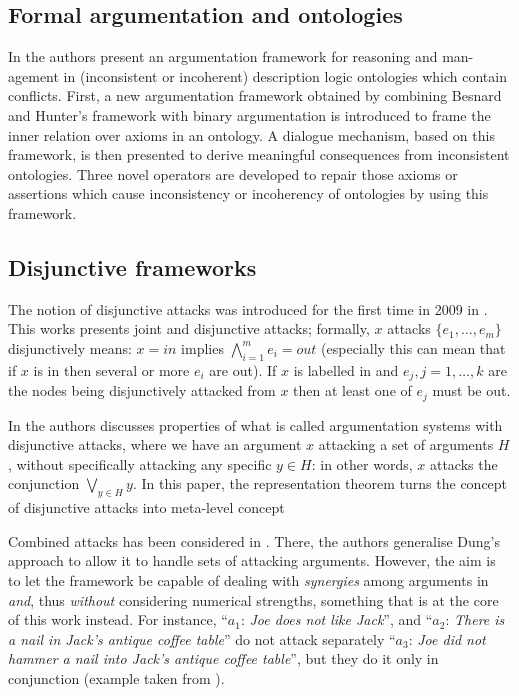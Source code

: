 \documentclass{llncs}%
\begin{document}
    
\subsection{Formal argumentation and ontologies}
In \cite{ontology} the authors present an argumentation framework for reasoning and man- agement in (inconsistent or incoherent) description logic ontologies which contain conflicts. First, a new argumentation framework obtained by combining Besnard and Hunter’s framework with binary argumentation is introduced to frame the inner relation over axioms in an ontology. A dialogue mechanism, based on this framework, is then presented to derive meaningful consequences from inconsistent ontologies. Three novel operators are developed to repair those axioms or assertions which cause inconsistency or incoherency of ontologies by using this framework.

\subsection{Disjunctive frameworks}
The notion of disjunctive attacks was introduced for the first time  in 2009 in \cite{gabbay0}. This works presents joint and disjunctive attacks; formally, $x$ attacks $\{e_1,\dots, e_m\}$ disjunctively means:
$x = \mathit{in}$ implies $\bigwedge^m_{i=1} e_i = \mathit{out}$ 
(especially this can mean that if $x$ is in then several or more $e_i$ are out). If $x$ is labelled in and $e_j, j = 1, \dots,k$ are the nodes being disjunctively attacked from $x$ then at least one of $e_j$ must be out.

In \cite{gabbay1} the authors discusses properties of what is called argumentation systems with disjunctive attacks, where we have an argument $x$ attacking
a set of arguments $H$, without specifically attacking any specific $y \in H$: in other words, $x$ attacks the conjunction $\bigvee_{y \in H} y$. In this paper, the representation theorem turns the concept of disjunctive attacks into meta-level concept


Combined attacks has been  considered in \cite{parsons06}. There,  the authors generalise Dung's approach to allow it to handle sets of attacking arguments. However, the aim is to let the framework be capable of dealing with \emph{synergies} among arguments in \emph{and}, thus \emph{without} considering numerical strengths, something that is at the core of this work instead. For instance, ``$a_1$: \emph{Joe does not like Jack}'', and ``$a_2$: \emph{There is a nail in Jack's antique coffee table}'' do not attack separately ``$a_3$: \emph{Joe did not hammer a nail into Jack's antique coffee table}'', but they do it only in conjunction (example taken from \cite{parsons06}).
\end{document}
